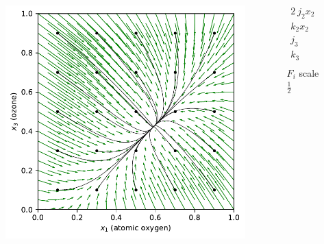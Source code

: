 \begin{columns}
\begin{column}{0.65\textwidth}
\vspace{-0.35in}
\begin{figure}
\includegraphics[scale=0.65]{../plots/chapman.pdf}
\end{figure}
\end{column}
\begin{column}{0.35\textwidth}
\vspace{-0.35in}
\begin{align*}
2 \ j_2 x_2 &= 0.1 \\
k_2 x_2 &= 0.3 \\
j_3 &= 0.3 \\
k_3 &= 0.2 \\
\end{align*}
\hspace{0.4in} $F_i$ scale $\frac{1}{2}$
\end{column}
\end{columns}
